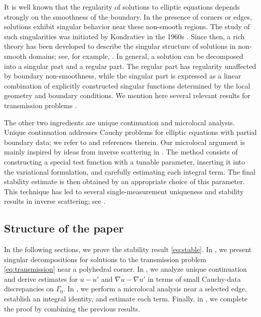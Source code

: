 ﻿\documentclass[11pt,reqno,oneside]{amsart}
\theoremstyle{definition}
\theoremstyle{remark}
\newcommand{\n}{\nabla}
\begin{document}
It is well known that the regularity of solutions to elliptic equations depends strongly on the smoothness of the boundary. In the presence of corners or edges, solutions exhibit singular behavior near these non-smooth regions. The study of such singularities was initiated by Kondratiev in the 1960s \cite{Kondratev1967}. Since then, a rich theory has been developed to describe the singular structure of solutions in non-smooth domains; see, for example, \cite{Grisvard1985,Dauge1988,Kozlov2002,Mazya2010}. In general, a solution can be decomposed into a singular part and a regular part. The regular part has regularity unaffected by boundary non-smoothness, while the singular part is expressed as a linear combination of explicitly constructed singular functions determined by the local geometry and boundary conditions. We mention here several relevant results for transmission problems \cite{Kellogg1971,Nicaise1990,Nicaise1994i,Nicaise1994ii,Dauge1989Oblique,Rempel1989,Dauge1999,Costabel1999}.

The other two ingredients are unique continuation and microlocal analysis. Unique continuation addresses Cauchy problems for elliptic equations with partial boundary data; we refer to \cite{Alessandrini2009} and references therein. Our microlocal argument is mainly inspired by ideas from inverse scattering in \cite{Blsten2014,Elschner2015}. The method consists of constructing a special test function with a tunable parameter, inserting it into the variational formulation, and carefully estimating each integral term. The final stability estimate is then obtained by an appropriate choice of this parameter. This technique has led to several single-measurement uniqueness and stability results in inverse scattering; see \cite{Blsten2017,Blasten2016,Blsten2020,Liu2022,Cakoni2021}.

\subsection{Structure of the paper} 

In the following sections, we prove the stability result \eqref{eq:stable}. In , we present singular decompositions for solutions to the transmission problem \eqref{eq:transmission} near a polyhedral corner. In , we analyze unique continuation and derive estimates for $u-u'$ and $\n u-\n u'$ in terms of small Cauchy-data discrepancies on $\Gamma_0$. In , we perform a microlocal analysis near a selected edge, establish an integral identity, and estimate each term. Finally, in , we complete the proof by combining the previous results.
\end{document}
